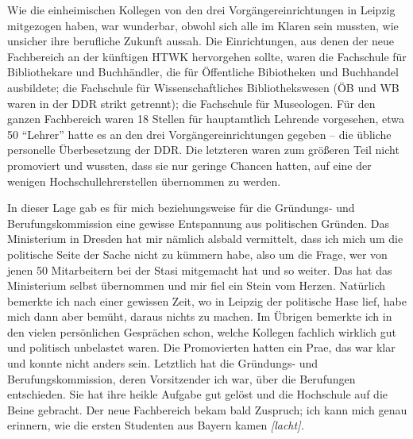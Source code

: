 \documentclass[a4paper,
fontsize=11pt,
oneside,
numbers=noperiodatend,
parskip=half-,
bibliography=totoc,
final
]{scrartcl}
\begin{document}
Wie die einheimischen Kollegen von den drei Vorgängereinrichtungen in
Leipzig mitgezogen haben, war wunderbar, obwohl sich alle im Klaren sein
mussten, wie unsicher ihre berufliche Zukunft aussah. Die Einrichtungen,
aus denen der neue Fachbereich an der künftigen HTWK hervorgehen sollte,
waren die Fachschule für Bibliothekare und Buchhändler, die für
Öffentliche Bibiotheken und Buchhandel ausbildete; die Fachschule für
Wissenschaftliches Bibliothekswesen (ÖB und WB waren in der DDR strikt
getrennt); die Fachschule für Museologen. Für den ganzen Fachbereich
waren 18 Stellen für hauptamtlich Lehrende vorgesehen, etwa 50
\enquote{Lehrer} hatte es an den drei Vorgängereinrichtungen gegeben --
die übliche personelle Überbesetzung der DDR. Die letzteren waren zum
größeren Teil nicht promoviert und wussten, dass sie nur geringe Chancen
hatten, auf eine der wenigen Hochschullehrerstellen übernommen zu
werden.

In dieser Lage gab es für mich beziehungsweise für die Gründungs- und
Berufungskommission eine gewisse Entspannung aus politischen Gründen.
Das Ministerium in Dresden hat mir nämlich alsbald vermittelt, dass ich
mich um die politische Seite der Sache nicht zu kümmern habe, also um
die Frage, wer von jenen 50 Mitarbeitern bei der Stasi mitgemacht hat
und so weiter. Das hat das Ministerium selbst übernommen und mir fiel
ein Stein vom Herzen. Natürlich bemerkte ich nach einer gewissen Zeit,
wo in Leipzig der politische Hase lief, habe mich dann aber bemüht,
daraus nichts zu machen. Im Übrigen bemerkte ich in den vielen
persönlichen Gesprächen schon, welche Kollegen fachlich wirklich gut und
politisch unbelastet waren. Die Promovierten hatten ein Prae, das war
klar und konnte nicht anders sein. Letztlich hat die Gründungs- und
Berufungskommission, deren Vorsitzender ich war, über die Berufungen
entschieden. Sie hat ihre heikle Aufgabe gut gelöst und die Hochschule
auf die Beine gebracht. Der neue Fachbereich bekam bald Zuspruch; ich
kann mich genau erinnern, wie die ersten Studenten aus Bayern kamen
\emph{{[}lacht{]}.}
\end{document}
